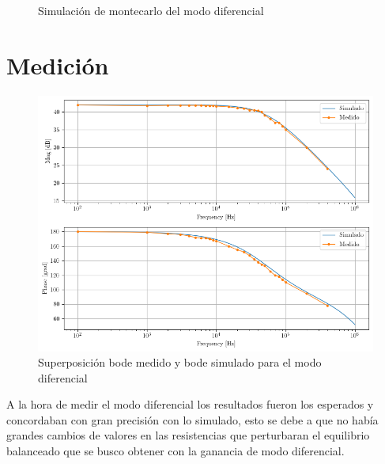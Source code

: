 \documentclass[11pt, a4paper]{article}
\begin{document}
\begin{center}
	\begin{figure}[H]	
	\caption{Simulación de montecarlo del modo diferencial}
	\label{fig:montecarlodiferencial}
	\end{figure}
\end{center}


\section{Medición}

\begin{figure}[H]
\centering
\includegraphics[scale=0.6]{Bode-DIFerencial.png}
\caption{Superposición bode medido y bode simulado para el modo diferencial}
\label{fig:bodemedidodif}
\end{figure}

A la hora de medir el modo diferencial los resultados fueron los esperados y concordaban con gran precisión con lo simulado, esto se debe a que no había grandes cambios de valores en las resistencias que perturbaran el equilibrio balanceado que se busco obtener con la ganancia de modo diferencial.
\end{document}
